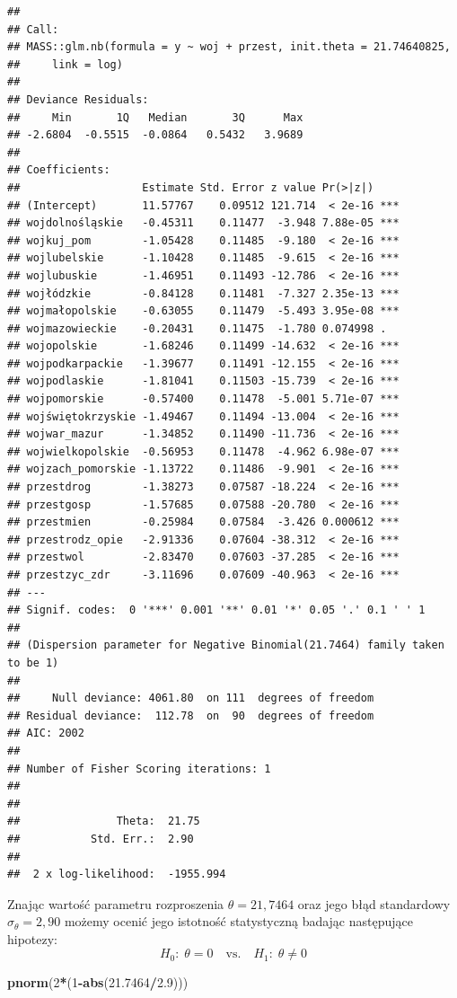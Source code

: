 \documentclass[polish,]{book}
\newenvironment{Shaded}{\begin{snugshade}}{\end{snugshade}}
\newcommand{\DecValTok}[1]{\textcolor[rgb]{0.00,0.00,0.81}{#1}}
\newcommand{\FloatTok}[1]{\textcolor[rgb]{0.00,0.00,0.81}{#1}}
\newcommand{\KeywordTok}[1]{\textcolor[rgb]{0.13,0.29,0.53}{\textbf{#1}}}
\newcommand{\NormalTok}[1]{#1}
\newcommand{\OperatorTok}[1]{\textcolor[rgb]{0.81,0.36,0.00}{\textbf{#1}}}
\begin{document}
\begin{verbatim}
## 
## Call:
## MASS::glm.nb(formula = y ~ woj + przest, init.theta = 21.74640825, 
##     link = log)
## 
## Deviance Residuals: 
##     Min       1Q   Median       3Q      Max  
## -2.6804  -0.5515  -0.0864   0.5432   3.9689  
## 
## Coefficients:
##                   Estimate Std. Error z value Pr(>|z|)    
## (Intercept)       11.57767    0.09512 121.714  < 2e-16 ***
## wojdolnośląskie   -0.45311    0.11477  -3.948 7.88e-05 ***
## wojkuj_pom        -1.05428    0.11485  -9.180  < 2e-16 ***
## wojlubelskie      -1.10428    0.11485  -9.615  < 2e-16 ***
## wojlubuskie       -1.46951    0.11493 -12.786  < 2e-16 ***
## wojłódzkie        -0.84128    0.11481  -7.327 2.35e-13 ***
## wojmałopolskie    -0.63055    0.11479  -5.493 3.95e-08 ***
## wojmazowieckie    -0.20431    0.11475  -1.780 0.074998 .  
## wojopolskie       -1.68246    0.11499 -14.632  < 2e-16 ***
## wojpodkarpackie   -1.39677    0.11491 -12.155  < 2e-16 ***
## wojpodlaskie      -1.81041    0.11503 -15.739  < 2e-16 ***
## wojpomorskie      -0.57400    0.11478  -5.001 5.71e-07 ***
## wojświętokrzyskie -1.49467    0.11494 -13.004  < 2e-16 ***
## wojwar_mazur      -1.34852    0.11490 -11.736  < 2e-16 ***
## wojwielkopolskie  -0.56953    0.11478  -4.962 6.98e-07 ***
## wojzach_pomorskie -1.13722    0.11486  -9.901  < 2e-16 ***
## przestdrog        -1.38273    0.07587 -18.224  < 2e-16 ***
## przestgosp        -1.57685    0.07588 -20.780  < 2e-16 ***
## przestmien        -0.25984    0.07584  -3.426 0.000612 ***
## przestrodz_opie   -2.91336    0.07604 -38.312  < 2e-16 ***
## przestwol         -2.83470    0.07603 -37.285  < 2e-16 ***
## przestzyc_zdr     -3.11696    0.07609 -40.963  < 2e-16 ***
## ---
## Signif. codes:  0 '***' 0.001 '**' 0.01 '*' 0.05 '.' 0.1 ' ' 1
## 
## (Dispersion parameter for Negative Binomial(21.7464) family taken to be 1)
## 
##     Null deviance: 4061.80  on 111  degrees of freedom
## Residual deviance:  112.78  on  90  degrees of freedom
## AIC: 2002
## 
## Number of Fisher Scoring iterations: 1
## 
## 
##               Theta:  21.75 
##           Std. Err.:  2.90 
## 
##  2 x log-likelihood:  -1955.994
\end{verbatim}

Znając wartość parametru rozproszenia \(\theta = 21,7464\) oraz jego błąd standardowy \(\sigma_\theta = 2,90\) możemy ocenić jego istotność statystyczną badając następujące hipotezy:
\[
H_0:\;\theta=0\quad\mbox{vs.}\quad H_1:\;\theta\neq 0
\]

\begin{Shaded}
\begin{Highlighting}[]
\KeywordTok{pnorm}\NormalTok{(}\DecValTok{2}\OperatorTok{*}\NormalTok{(}\DecValTok{1}\OperatorTok{-}\KeywordTok{abs}\NormalTok{(}\FloatTok{21.7464}\OperatorTok{/}\FloatTok{2.9}\NormalTok{)))}
\end{Highlighting}
\end{Shaded}
\end{document}

